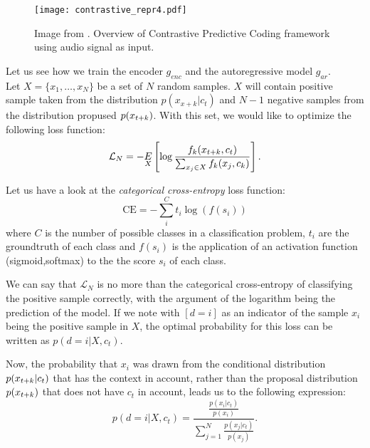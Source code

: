 \begin{figure}[H]
    \centering 
    \texttt{[image: contrastive\_repr4.pdf]}
    \caption{Image from \citep{oord_representation_2019}. Overview of Contrastive Predictive Coding framework using audio signal as input. }
\end{figure}



Let us see how we train the encoder $g_{enc}$ and the autoregressive model $g_{ar}$.\\

Let $X = \{x_1,\dots,x_N\}$ be a set of $N$ random samples. $X$ will contain positive sample taken from the distribution $p(x_{x+k}|c_t)$ and $N-1$ negative
samples from the distribution propused $p(x_{t+k})$. With this set, we would like to optimize the following loss function:
\begin{equation}\label{NCE:loss}
\mathcal L_N = - \underset{X}{E} \left[\log \frac{f_k(x_{t+k},c_t)}{\sum_{x_j \in X} f_k(x_j,c_k)}\right].
\end{equation}

Let us have a look at the \emph{categorical cross-entropy} loss function:
\[
    \text{CE} = -\sum_i^C t_i \log(f(s_i))    
\]
where $C$ is the number of possible classes in a classification problem, $t_i$ are the groundtruth of each class and $f(s_i)$ is the application of an activation function (sigmoid,softmax) to the the score $s_i$ of each class.

We can say that $\mathcal L_N$ is no more than the categorical cross-entropy of classifying the positive sample correctly, with the argument of the logarithm being the prediction
of the model. If we note with $[d = i]$ as an indicator of the sample $x_i$ being the positive sample in $X$, the optimal probability for this loss can be written as $p(d = i|X,c_t)$. 

Now, the probability that $x_i$ was drawn from the conditional distribution $p(x_{t+k}|c_t)$ that has the context in account, rather than the proposal distribution $p(x_{t+k})$ that does not have $c_t$ in account, leads us to the following expression:
$$
p(d = i | X , c_t) = \frac{ \frac{p(x_i|c_t)}{p(x_i)}}{\sum_{j=1}^N \frac{p(x_j|c_t)}{p(x_j)}}.
$$

